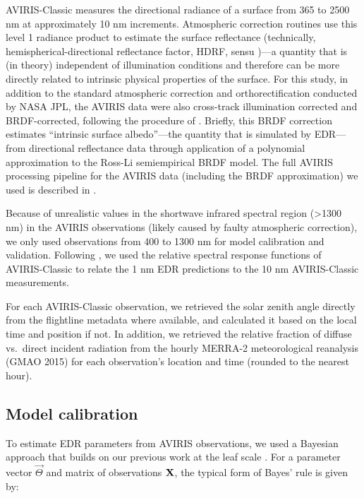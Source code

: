AVIRIS-Classic measures the directional radiance of a surface from 365 to 2500 \unit{nm} at approximately 10 \unit{nm} increments.
Atmospheric correction routines use this level 1 radiance product to estimate the surface reflectance (technically, hemispherical-directional reflectance factor, HDRF, sensu \citealt{schaepman-strub2006reflectance})---a quantity that is (in theory) independent of illumination conditions and therefore can be more directly related to intrinsic physical properties of the surface.
For this study, in addition to the standard atmospheric correction and orthorectification conducted by NASA JPL,
the AVIRIS data were also cross-track illumination corrected and BRDF-corrected, following the procedure of \citet{lucht2000algorithm}.
Briefly, this BRDF correction estimates ``intrinsic surface albedo''---the quantity that is simulated by EDR---from directional reflectance data through application of a polynomial approximation to the Ross-Li semiempirical BRDF model.
The full AVIRIS processing pipeline for the  AVIRIS data (including the BRDF approximation) we used is described in \citet{singh2015imaging}.

Because of unrealistic values in the shortwave infrared spectral region (>1300 \unit{nm}) in the AVIRIS observations (likely caused by faulty atmospheric correction), we only used observations from 400 to 1300 \unit{nm} for model calibration and validation.
Following \citet{shiklomanov2016quantifying}, we used the relative spectral response functions of AVIRIS-Classic to relate the 1 \unit{nm} EDR predictions to the 10 \unit{nm} AVIRIS-Classic measurements.

For each AVIRIS-Classic observation, we retrieved the solar zenith angle directly from the flightline metadata where available, and calculated it based on the local time and position if not.
In addition, we retrieved the relative fraction of diffuse vs.\ direct incident radiation from the hourly MERRA-2 meteorological reanalysis (GMAO 2015) for each observation's location and time (rounded to the nearest hour).

\subsection{Model calibration}

To estimate EDR parameters from AVIRIS observations, we used a Bayesian approach that builds on our previous work at the leaf scale \citep{shiklomanov2016quantifying}.
For a parameter vector $\vec{\Theta}$ and matrix of observations $\mathbf{X}$, the typical form of Bayes' rule is given by:

